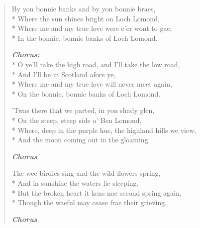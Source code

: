 \documentclass[9pt,twoside]{extarticle}
\newenvironment{xverse}{
	\begin{verse}
	\fontsize{8.5}{10.5}\selectfont
	}
	{
	\end{verse}
	\penalty 0
}
\newcommand{\chorusdef}{\textbf{\emph{Chorus:}}\\*}
\newcommand{\chorusmark}[1][1]{%
\vspace{-0.5\stanzaskip}%
\textbf{\emph{Chorus \ifthenelse{\equal{#1}{1}}{}{$\times$ #1}}}%
\vspace{-0.5\stanzaskip}%
}
\begin{document}
\begin{xverse}
By yon bonnie banks and by yon bonnie braes, \\*
Where the sun shines bright on Loch Lomond, \\*
Where me and my true love were e’er wont to gae, \\*
In the bonnie, bonnie banks of Loch Lomond.

\chorusdef
O ye’ll take the high road, and I’ll take the low road, \\*
And I’ll be in Scotland afore ye, \\*
Where me and my true love will never meet again, \\*
On the bonnie, bonnie banks of Loch Lomond.

’Twas there that we parted, in yon shady glen, \\*
On the steep, steep side o’ Ben Lomond, \\*
Where, deep in the purple hue, the highland hills we view, \\*
And the moon coming out in the gloaming.

\chorusmark

The wee birdies sing and the wild flowers spring, \\*
And in sunshine the waters lie sleeping. \\*
But the broken heart it kens nae second spring again, \\*
Though the waeful may cease frae their grieving.

\chorusmark
\end{xverse}
\end{document}
